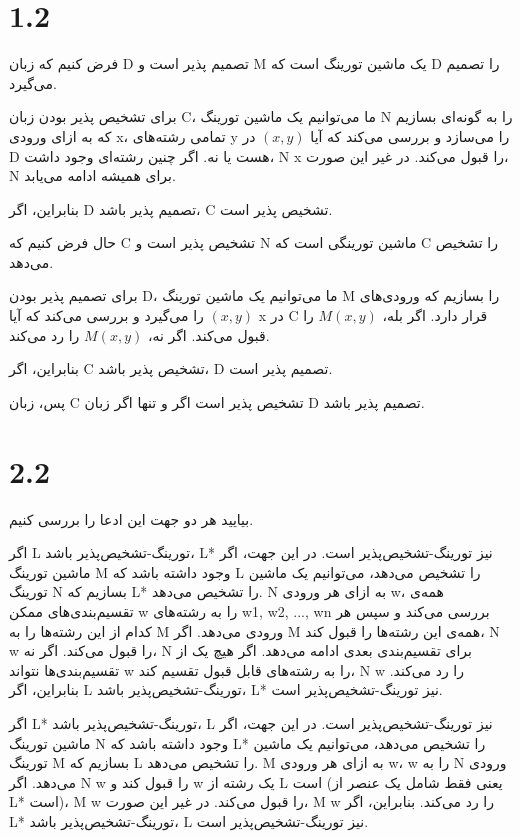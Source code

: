 \section*{1.2}

فرض کنیم که زبان D تصمیم پذیر است و M یک ماشین تورینگ است که D را تصمیم می‌گیرد.

برای تشخیص پذیر بودن زبان C، ما می‌توانیم یک ماشین تورینگ N را به گونه‌ای بسازیم که به ازای ورودی x، تمامی رشته‌های y را می‌سازد و بررسی می‌کند که آیا 
$(x,y)$
در D هست یا نه. اگر چنین رشته‌ای وجود داشت، N x را قبول می‌کند. در غیر این صورت، N برای همیشه ادامه می‌یابد.

بنابراین، اگر D تصمیم پذیر باشد، C تشخیص پذیر است.

حال فرض کنیم که C تشخیص پذیر است و N ماشین تورینگی است که C را تشخیص می‌دهد.

برای تصمیم پذیر بودن D، ما می‌توانیم یک ماشین تورینگ M را بسازیم که ورودی‌های 
$(x,y)$
را می‌گیرد و بررسی می‌کند که آیا x در C قرار دارد. اگر بله،
$M (x,y)$
را قبول می‌کند. اگر نه،
$M (x,y)$
را رد می‌کند.

بنابراین، اگر C تشخیص پذیر باشد، D تصمیم پذیر است.

پس، زبان C تشخیص پذیر است اگر و تنها اگر زبان D تصمیم پذیر باشد.

\section*{2.2}

بیایید هر دو جهت این ادعا را بررسی کنیم.

اگر L تورینگ-تشخیص‌پذیر باشد، L* نیز تورینگ-تشخیص‌پذیر است.
در این جهت، اگر ماشین تورینگ M وجود داشته باشد که L را تشخیص می‌دهد، می‌توانیم یک ماشین تورینگ N بسازیم که L* را تشخیص می‌دهد. N به ازای هر ورودی w، همه‌ی تقسیم‌بندی‌های ممکن w را به رشته‌های w1, w2, ..., wn بررسی می‌کند و سپس هر کدام از این رشته‌ها را به M ورودی می‌دهد. اگر M همه‌ی این رشته‌ها را قبول کند، N w را قبول می‌کند. اگر نه، N برای تقسیم‌بندی بعدی ادامه می‌دهد. اگر هیچ یک از تقسیم‌بندی‌ها نتواند w را به رشته‌های قابل قبول تقسیم کند، N w را رد می‌کند. بنابراین، اگر L تورینگ-تشخیص‌پذیر باشد، L* نیز تورینگ-تشخیص‌پذیر است.

اگر L* تورینگ-تشخیص‌پذیر باشد، L نیز تورینگ-تشخیص‌پذیر است.
در این جهت، اگر ماشین تورینگ N وجود داشته باشد که L* را تشخیص می‌دهد، می‌توانیم یک ماشین تورینگ M بسازیم که L را تشخیص می‌دهد. M به ازای هر ورودی w، w را به N ورودی می‌دهد. اگر N w را قبول کند و w یک رشته از L است (یعنی فقط شامل یک عنصر از L* است)، M w را قبول می‌کند. در غیر این صورت، M w را رد می‌کند. بنابراین، اگر L* تورینگ-تشخیص‌پذیر باشد، L نیز تورینگ-تشخیص‌پذیر است.

